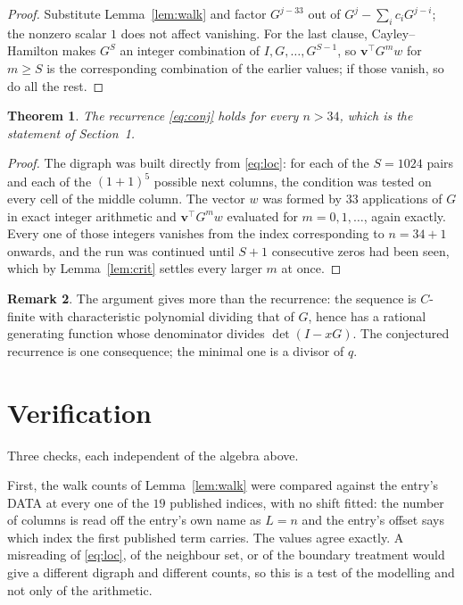 \documentclass[11pt,a4paper]{article}
\theoremstyle{plain}
\newtheorem{theorem}{Theorem}
\theoremstyle{definition}
\newtheorem{remark}[theorem]{Remark}
\begin{document}
\begin{proof}
Substitute Lemma~\ref{lem:walk} and factor $G^{j-33}$ out of
$G^{j}-\sum_ic_iG^{j-i}$; the nonzero scalar $1$ does not affect
vanishing. For the last clause, Cayley--Hamilton makes $G^{S}$ an integer combination of
$I,G,\dots,G^{S-1}$, so $\mathbf{v}^{\!\top}G^{m}w$ for $m\ge S$ is the corresponding
combination of the earlier values; if those vanish, so do all the rest.
\end{proof}

\begin{theorem}
The recurrence \eqref{eq:conj} holds for every $n>34$, which is the statement of
Section~1.
\end{theorem}

\begin{proof}
The digraph was built directly from \eqref{eq:loc}: for each of the $S=1024$ pairs and each
of the $(1+1)^{5}$ possible next columns, the condition was tested on every cell of
the middle column. The vector $w$ was formed by $33$ applications of $G$ in exact integer
arithmetic and $\mathbf{v}^{\!\top}G^{m}w$ evaluated for $m=0,1,\dots$, again exactly.
Every one of those integers vanishes from the index corresponding to $n=34+1$ onwards,
and the run was continued until $S+1$ consecutive zeros had been seen, which by
Lemma~\ref{lem:crit} settles every larger $m$ at once.
\end{proof}

\begin{remark}
The argument gives more than the recurrence: the sequence is $C$-finite with characteristic
polynomial dividing that of $G$, hence has a rational generating function whose denominator
divides $\det(I-xG)$. The conjectured recurrence is one consequence; the minimal one is a
divisor of $q$.
\end{remark}

\section{Verification}

Three checks, each independent of the algebra above.

First, the walk counts of Lemma~\ref{lem:walk} were compared against the entry's DATA at
every one of the $19$ published indices, with no shift fitted: the number of columns is
read off the entry's own name as $L=n$ and the entry's offset says which index the first
published term carries. The values agree exactly. A misreading of \eqref{eq:loc}, of the
neighbour set, or of the boundary treatment would give a different digraph and different
counts, so this is a test of the modelling and not only of the arithmetic.
\end{document}
